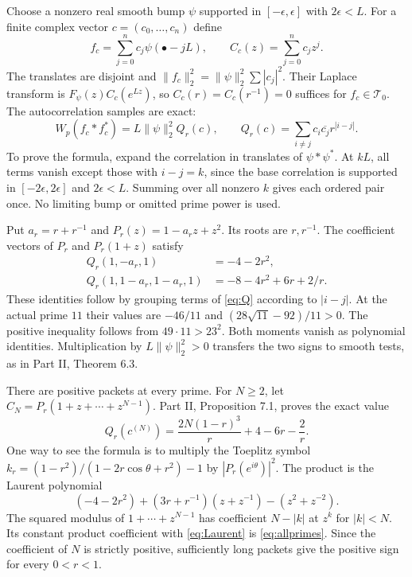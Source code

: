 \documentclass[11pt,letterpaper]{article}
\theoremstyle{definition}
\theoremstyle{remark}
\newcommand{\T}{\mathcal T}
\begin{document}
Choose a nonzero real smooth bump $\psi$ supported in
$[-\epsilon,\epsilon]$ with $2\epsilon<L$. For a finite complex
vector $c=(c_0,\ldots,c_n)$ define
\begin{equation}
 f_c=\sum_{j=0}^n c_j\psi(\bullet-jL),\qquad
 C_c(z)=\sum_{j=0}^nc_jz^j.
 \label{eq:packet}
\end{equation}
The translates are disjoint and
$\|f_c\|_2^2=\|\psi\|_2^2\sum|c_j|^2$.
Their Laplace transform is $F_\psi(z)C_c(e^{Lz})$, so
$C_c(r)=C_c(r^{-1})=0$ suffices for $f_c\in\T_0$.
The autocorrelation samples are exact:
\begin{equation}
 W_p(f_c*f_c^*)=L\|\psi\|_2^2Q_r(c),\qquad
 Q_r(c)=\sum_{i\ne j}c_i\overline{c_j}r^{|i-j|}.
 \label{eq:Q}
\end{equation}
To prove the formula, expand the correlation in translates of
$\psi*\psi^*$. At $kL$, all terms vanish except those with
$i-j=k$, since the base correlation is supported in
$[-2\epsilon,2\epsilon]$ and $2\epsilon<L$.
Summing over all nonzero $k$ gives each
ordered pair once. No limiting bump or omitted prime power is
used.

Put $a_r=r+r^{-1}$ and $P_r(z)=1-a_rz+z^2$.
Its roots are $r,r^{-1}$. The coefficient vectors of $P_r$
and $P_r(1+z)$ satisfy
\begin{align}
 Q_r(1,-a_r,1)&=-4-2r^2,\label{eq:Qminus}\\
 Q_r(1,1-a_r,1-a_r,1)&=-8-4r^2+6r+2/r.
 \label{eq:Qplus}
\end{align}
These identities follow by grouping terms of \eqref{eq:Q}
according to $|i-j|$. At the actual prime $11$ their values
are $-46/11$ and $(28\sqrt{11}-92)/11>0$. The positive
inequality follows from $49\cdot11>23^2$. Both moments vanish
as polynomial identities. Multiplication by
$L\|\psi\|_2^2>0$ transfers the two signs to smooth tests,
as in Part II, Theorem 6.3.

There are positive packets at every prime. For $N\ge2$, let
$C_N=P_r(1+z+\cdots+z^{N-1})$. Part II, Proposition 7.1,
proves the exact value
\begin{equation}
 Q_r(c^{(N)})=\frac{2N(1-r)^3}{r}+4-6r-\frac2r.
 \label{eq:allprimes}
\end{equation}
One way to see the formula is to multiply the Toeplitz symbol
$k_r=(1-r^2)/(1-2r\cos\theta+r^2)-1$ by $|P_r(e^{i\theta})|^2$.
The product is the Laurent polynomial
\begin{equation}
 (-4-2r^2)+(3r+r^{-1})(z+z^{-1})-(z^2+z^{-2}).
 \label{eq:Laurent}
\end{equation}
The squared modulus of $1+\cdots+z^{N-1}$ has coefficient
$N-|k|$ at $z^k$ for $|k|<N$. Its constant product coefficient
with \eqref{eq:Laurent} is \eqref{eq:allprimes}. Since the
coefficient of $N$ is strictly positive, sufficiently long
packets give the positive sign for every $0<r<1$.
\end{document}
